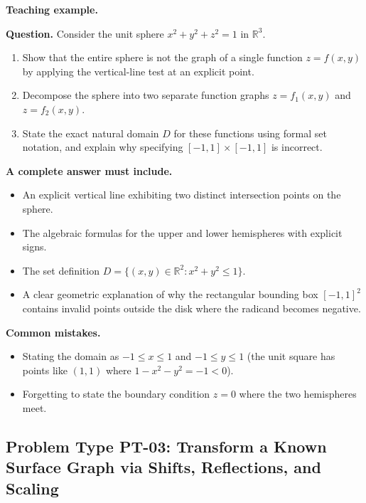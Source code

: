 \documentclass[11pt,letterpaper]{article}
\newcommand{\R}{\mathbb{R}}
\begin{document}
\textbf{Teaching example.}

\textbf{Question.} 
Consider the unit sphere $x^2 + y^2 + z^2 = 1$ in $\R^3$.
\begin{enumerate}[label=(\alph*),nosep]
    \item Show that the entire sphere is not the graph of a single function $z = f(x,y)$ by applying the vertical-line test at an explicit point.
    \item Decompose the sphere into two separate function graphs $z = f_1(x,y)$ and $z = f_2(x,y)$.
    \item State the exact natural domain $D$ for these functions using formal set notation, and explain why specifying $[-1,1] \times [-1,1]$ is incorrect.
\end{enumerate}

\textbf{A complete answer must include.}
\begin{itemize}[leftmargin=*,nosep]
    \item An explicit vertical line exhibiting two distinct intersection points on the sphere.
    \item The algebraic formulas for the upper and lower hemispheres with explicit signs.
    \item The set definition $D = \{(x,y) \in \R^2 : x^2+y^2 \le 1\}$.
    \item A clear geometric explanation of why the rectangular bounding box $[-1,1]^2$ contains invalid points outside the disk where the radicand becomes negative.
\end{itemize}

\textbf{Common mistakes.}
\begin{itemize}[leftmargin=*,nosep]
    \item Stating the domain as $-1 \le x \le 1$ and $-1 \le y \le 1$ (the unit square has points like $(1,1)$ where $1 - x^2 - y^2 = -1 < 0$).
    \item Forgetting to state the boundary condition $z=0$ where the two hemispheres meet.
\end{itemize}

\subsection{Problem Type PT-03: Transform a Known Surface Graph via Shifts, Reflections, and Scaling}\label{pt:03}
\end{document}
